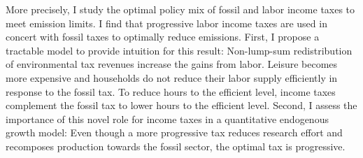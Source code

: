 \begin{comment}
When labor supply is fixed, environmental taxes alone can establish the efficient allocation in a representative agent economy absent fiscal distortions. Then, such a tax instrument is optimally set to the social cost of an externality, and originators internalize these social costs: the Pigou principle.
However, not redistributing environmental tax revenues reduces consumption below the efficient level and, as I demonstrate, the optimal environmental tax does not follow the Pigou principle.  If, on top, the  labor supply decision is endogenous, the environmental tax alone features too high labor supply. \tr{This results in too high environmental externality. \textbf{To be shown!}}

Lump-sum transfers of environmental tax revenues restore the efficient allocation: as households become richer, labor supply reduces. When lump-sum transfers are not available, the government can establish the efficient allocation by redistributing environmental tax revenues through an income tax scheme which I demonstrate to be progressive.

content...
\end{comment}

More precisely, I study the optimal policy mix of fossil and labor income taxes to meet emission limits. 
I find that progressive labor income taxes are used in concert with fossil taxes to optimally reduce emissions. 
 First, I propose a tractable model to provide intuition for this result: Non-lump-sum redistribution of environmental tax revenues increase the gains from labor. Leisure becomes more expensive and households do not reduce their labor supply efficiently in response to the fossil tax. To reduce hours to the efficient level, income taxes complement the fossil tax to lower hours to the efficient level.  
Second, I assess the importance of this novel role for income taxes in a quantitative endogenous growth model:
Even though a more progressive tax reduces research effort  and recomposes production towards the fossil sector, the optimal tax is progressive. 

